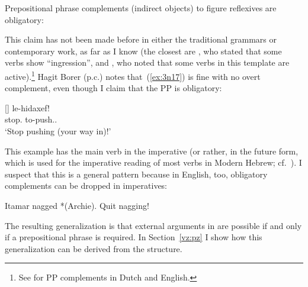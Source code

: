\begin{exe}
\begin{xlist}
\begin{xlist}
\begin{exe}
\begin{xlist}
\begin{xlist}
\begin{exe}
\begin{xlist}
\begin{xlist}
\begin{exe}
\begin{exe}
\begin{xlist}
\begin{exe}
\begin{exe}
\begin{xlist}
\begin{exe}
\begin{exe}
\begin{exe}
\begin{exe}
\begin{exe}
\begin{xlist}
 \begin{exe}
 \ex  Prepositional phrase complements (indirect objects) to figure reflexives are obligatory:  \label{ex:vz:pp}
 \begin{xlist} 
	
	
 \z
\z 

This claim has not been made before in either the traditional grammars or contemporary work, as far as I know (the closest are \citealt[87]{berman78}, who stated that some verbs show ``ingression'', and \citealt{schwarzwald08}, who noted that some verbs in this template are active).\footnote{See \cite{neeleman97} for PP complements in Dutch and English.} Hagit Borer (p.c.) notes that~(\ref{ex:3n17}) is fine with no overt complement, even though I claim that the PP is obligatory:
 \begin{exe}
\ex   \label{ex:3n17}
[] 	{ \gll {} le-hidaxef!\\
 	  stop. to-push..\\
 	\glt `Stop pushing (your way in)!' } 
	
 \z 

This example has the main verb in the imperative (or rather, in the future form, which is used for the imperative reading of most verbs in Modern Hebrew; cf.~\citealt{batel02lang}). I suspect that this is a general pattern because in English, too, obligatory complements can be dropped in imperatives:
 \begin{exe}
 \ex  
 \begin{xlist} 
 	\ex  Itamar nagged *(Archie). 
 	\ex  Quit nagging! 
 \z
\z 

The resulting generalization is that external arguments in {\tnif} are possible if and only if a prepositional phrase is required. In Section~\ref{vz:pz} I show how this generalization can be derived from the structure.


\end{xlist}
\end{exe}
\end{exe}
\end{xlist}
\end{exe}
\end{xlist}
\end{exe}
\end{exe}
\end{exe}
\end{exe}
\end{exe}
\end{xlist}
\end{exe}
\end{exe}
\end{xlist}
\end{exe}
\end{exe}
\end{xlist}
\end{xlist}
\end{exe}
\end{xlist}
\end{xlist}
\end{exe}
\end{xlist}
\end{xlist}
\end{exe}
